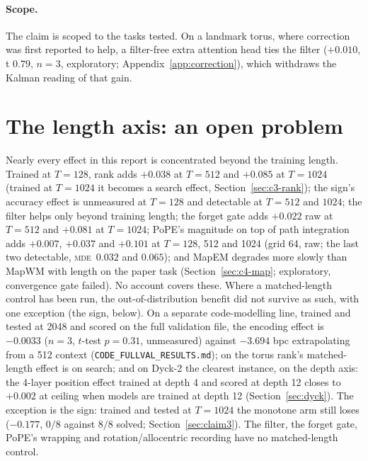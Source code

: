 \documentclass[10pt]{article}
\newcommand{\mde}{\textsc{mde}}
\begin{document}
\paragraph{Scope.} The claim is scoped to the tasks tested. On a landmark torus, where correction was first
reported to help, a filter-free extra attention head ties the filter ($+0.010$, t $0.79$, $n=3$,
exploratory; Appendix~\ref{app:correction}), which withdraws the Kalman reading of that gain.

\section{The length axis: an open problem}
\label{sec:length}

Nearly every effect in this report is concentrated beyond the training length. Trained at $T=128$, rank adds $+0.038$ at
$T=512$ and $+0.085$ at $T=1024$ (trained at $T=1024$ it becomes a search effect, Section~\ref{sec:c3-rank}); the sign's accuracy effect is unmeasured at $T=128$ and detectable at
$T=512$ and $1024$; the filter helps only beyond training length; the forget gate adds $+0.022$ raw at
$T=512$ and $+0.081$ at $T=1024$; PoPE's magnitude on top of path integration adds $+0.007$, $+0.037$ and
$+0.101$ at $T=128$, 512 and 1024 (grid 64, raw; the last two detectable, \mde\ $0.032$ and $0.065$); and MapEM degrades
more slowly than MapWM with length on the paper task (Section~\ref{sec:c4-map}; exploratory, convergence gate
failed). No account covers these. Where a matched-length control has been run, the out-of-distribution
benefit did not survive as such, with one exception (the sign, below). On a separate code-modelling line, trained and tested at 2048 and
scored on the full validation file, the encoding effect is $-0.0033$ ($n=3$, $t$-test $p=0.31$, unmeasured) against
$-3.694$ bpc extrapolating from a 512 context (\texttt{CODE\_FULLVAL\_RESULTS.md}); on the torus rank's matched-length
effect is on search; and on Dyck-2 the clearest instance, on the depth axis: the 4-layer position effect trained
at depth 4 and scored at depth 12 closes to $+0.002$ at ceiling when models are trained at depth 12
(Section~\ref{sec:dyck}). The exception is the sign: trained and tested at $T=1024$ the monotone arm still loses
($-0.177$, $0/8$ against $8/8$ solved; Section~\ref{sec:claim3}). The filter, the forget gate, PoPE's wrapping and
rotation/allocentric recording have no matched-length control.
\end{document}

